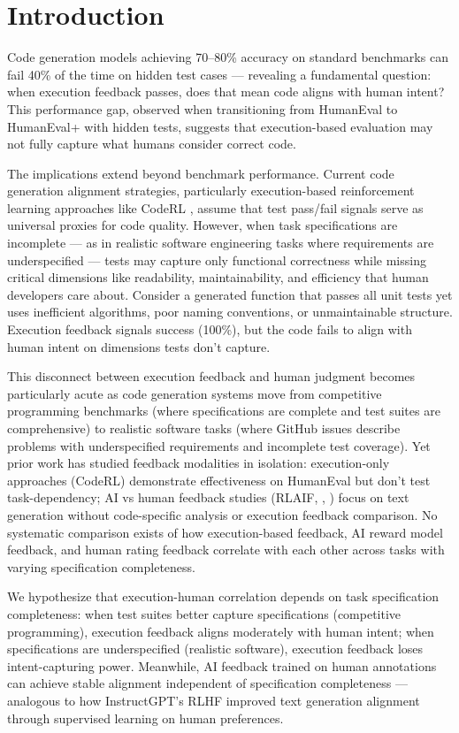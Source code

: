 \section{Introduction}

Code generation models achieving 70--80\% accuracy on standard benchmarks can fail 40\% of the time on hidden test cases \cite{liu2023your} --- revealing a fundamental question: when execution feedback passes, does that mean code aligns with human intent? This performance gap, observed when transitioning from HumanEval to HumanEval+ with hidden tests, suggests that execution-based evaluation may not fully capture what humans consider correct code.

The implications extend beyond benchmark performance. Current code generation alignment strategies, particularly execution-based reinforcement learning approaches like CodeRL \cite{le2022coderl}, assume that test pass/fail signals serve as universal proxies for code quality. However, when task specifications are incomplete --- as in realistic software engineering tasks where requirements are underspecified --- tests may capture only functional correctness while missing critical dimensions like readability, maintainability, and efficiency that human developers care about. Consider a generated function that passes all unit tests yet uses inefficient algorithms, poor naming conventions, or unmaintainable structure. Execution feedback signals success (100\%), but the code fails to align with human intent on dimensions tests don't capture.

This disconnect between execution feedback and human judgment becomes particularly acute as code generation systems move from competitive programming benchmarks (where specifications are complete and test suites are comprehensive) to realistic software tasks (where GitHub issues describe problems with underspecified requirements and incomplete test coverage). Yet prior work has studied feedback modalities in isolation: execution-only approaches (CodeRL) demonstrate effectiveness on HumanEval but don't test task-dependency; AI vs human feedback studies (RLAIF, \citeauthor{lee2023rlaif}, \citeyear{lee2023rlaif}) focus on text generation without code-specific analysis or execution feedback comparison. No systematic comparison exists of how execution-based feedback, AI reward model feedback, and human rating feedback correlate with each other across tasks with varying specification completeness.

We hypothesize that execution-human correlation depends on task specification completeness: when test suites better capture specifications (competitive programming), execution feedback aligns moderately with human intent; when specifications are underspecified (realistic software), execution feedback loses intent-capturing power. Meanwhile, AI feedback trained on human annotations can achieve stable alignment independent of specification completeness --- analogous to how InstructGPT's RLHF \cite{ouyang2022training} improved text generation alignment through supervised learning on human preferences.

